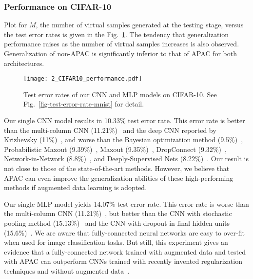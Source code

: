 \documentclass[10pt,twocolumn,letterpaper]{article}
\begin{document}
\subsubsection{Performance on CIFAR-10}
Plot for $M$, the number of virtual samples generated at the testing stage, 
versus the test error rates is given in the Fig.~\ref{fig-test-error-rate-cifar}.
The tendency that generalization performance raises 
as the number of virtual samples increases is also observed.
Generalization of non-APAC is significantly inferior to that of APAC for both architectures.

\begin{figure}[t]
\begin{center}
\texttt{[image: 2\_CIFAR10\_performance.pdf]}
\end{center}
\caption{Test error rates of our CNN and MLP models on CIFAR-10.
See Fig.~\ref{fig-test-error-rate-mnist} for detail.}
\label{fig-test-error-rate-cifar}
\end{figure}

Our single CNN model results in 10.33\% test error rate.
This error rate is better than the multi-column CNN (11.21\%)~\cite{Ciresan:2012b} and
the deep CNN reported by Krizhevsky \etal (11\%)~\cite{NIPS2012_4824}, and
worse than the Bayesian optimization method (9.5\%)~\cite{68},
Probabilistic Maxout (9.39\%)~\cite{SprRied2014a}, 
Maxout (9.35\%)~\cite{DBLP:conf/icml/GoodfellowWMCB13}, 
DropConnect (9.32\%)~\cite{icml2013_wan13}, 
Network-in-Network (8.8\%)~\cite{Lin2014}, and
Deeply-Supervised Nets (8.22\%)~\cite{2014arXiv1409.5185L}.
Our result is not close to those of the state-of-the-art methods.
However, we believe that APAC can even improve the generalization abilities of these high-performing methods
if augmented data learning is adopted.

Our single MLP model yields 14.07\% test error rate.
This error rate is worse than the multi-column CNN (11.21\%)~\cite{Ciresan:2012b},
but better than the CNN with stochastic pooling method (15.13\%)~\cite{2013arXiv1301.3557Z} and
the CNN with dropout in final hidden units (15.6\%)~\cite{2012arXiv1207.0580H}.
We are aware that fully-connected neural networks are easy to over-fit when used for image classification tasks.
But still, this experiment gives an evidence that 
a fully-connected network trained with augmented data and tested with APAC can outperform
CNNs trained with recently invented regularization techniques and 
without augmented data~\cite{2013arXiv1301.3557Z, 2012arXiv1207.0580H}.
\end{document}
